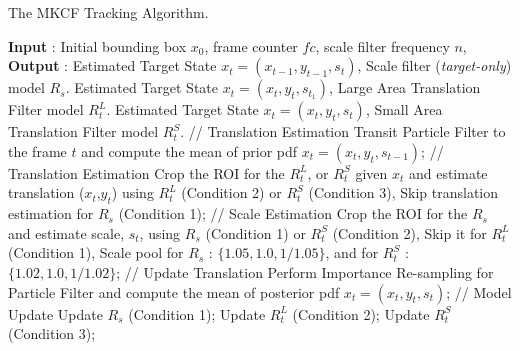 \documentclass[10pt,twocolumn,letterpaper]{article}
\begin{document}
\begin{algorithm}
	\caption{The MKCF Tracking Algorithm.}\label{alg:MKCF}
	\begin{algorithmic}[1]
	\State \textbf{Input} : Initial bounding box $x_{0}$, frame counter $fc$, scale filter frequency $n$,
	\State \textbf{Output} : 
				 
						\State Estimated Target State $x_{t} = (x_{t-1},y_{t-1},s_{t})$,
						Scale filter (\textit{target-only}) model $R_{s}$.
			     \EndIf
						\State Estimated Target State $x_{t} = (x_{t},y_{t},s_{t_1})$,
						Large Area Translation Filter model $R_{t}^{L}$.
				\EndIf
						\State Estimated Target State $x_{t} = (x_{t},y_{t},s_{t})$,
						Small Area Translation Filter model $R_{t}^{S}$.
				\EndIf
				\State // Translation Estimation
				\State Transit Particle Filter to the frame $t$ and compute the mean of prior pdf $x_{t} = (x_{t},y_{t},s_{t-1})$;
				\State // Translation Estimation
				\State Crop the ROI for the $R_{t}^{L}$, or $R_{t}^{S}$ given $x_{t}$
				and estimate translation ($x_{t}$,$y_{t}$) using $R_{t}^{L}$ (Condition 2) or $R_{t}^{S}$ (Condition 3),
				\State Skip translation estimation for $R_{s}$ (Condition 1);
				\State // Scale Estimation
			    \State Crop the ROI for the $R_{s}$ and estimate scale, $s_{t}$, using $R_{s}$ (Condition 1) or $R_{t}^{S}$ (Condition 2), 
		         \State Skip it for $R_{t}^{L}$ (Condition 1),
				\State Scale pool for $R_{s}$ : $\lbrace1.05,1.0,1/1.05\rbrace$, and for $R_{t}^{S}$ : $\lbrace1.02,1.0,1/1.02\rbrace$;
				\State // Update Translation
				\State Perform Importance Re-sampling for Particle Filter and compute the mean of posterior pdf $x_{t} = (x_{t},y_{t},s_{t})$;
			    \State // Model Update
				\State Update $R_{s}$ (Condition 1);
				\EndIf							 
				\State Update $R_{t}^{L}$ (Condition 2);
				\EndIf	
				\State Update $R_{t}^{S}$ (Condition 3);
			     \EndIf		
	\EndProcedure	
	\end{algorithmic}
\end{algorithm}
\end{document}
